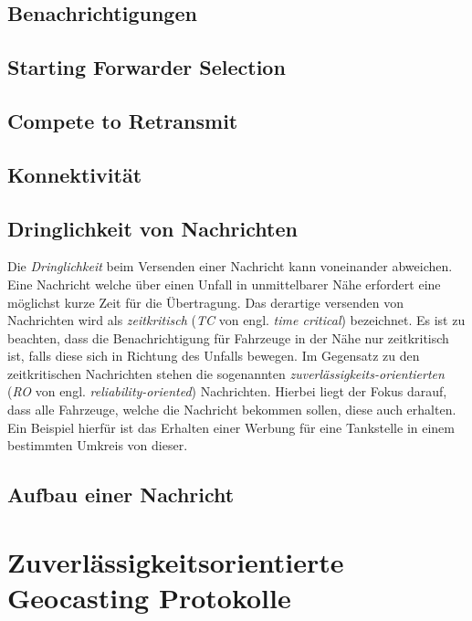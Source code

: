 \documentclass[english,runningheads,a4paper]{llncs}[2018/03/10]
\begin{document}
\subsection{Benachrichtigungen}

\subsection{Starting Forwarder Selection}

\subsection{Compete to Retransmit}

\subsection{Konnektivität}

\subsection{Dringlichkeit von Nachrichten}
Die \textit{Dringlichkeit} beim Versenden einer Nachricht kann voneinander abweichen.
Eine Nachricht welche über einen Unfall in unmittelbarer Nähe erfordert eine möglichst kurze Zeit für die Übertragung.
Das derartige versenden von Nachrichten wird als \textit{zeitkritisch} (\textit{TC} von engl. \textit{time critical}) bezeichnet.
Es ist zu beachten, dass die Benachrichtigung für Fahrzeuge in der Nähe nur zeitkritisch ist, falls diese sich in Richtung des Unfalls bewegen.
Im Gegensatz zu den zeitkritischen Nachrichten stehen die sogenannten \textit{zuverlässigkeits-orientierten} (\textit{RO} von engl. \textit{reliability-oriented}) Nachrichten.
Hierbei liegt der Fokus darauf, dass alle Fahrzeuge, welche die Nachricht bekommen sollen, diese auch erhalten.
Ein Beispiel hierfür ist das Erhalten einer Werbung für eine Tankstelle in einem bestimmten Umkreis von dieser.

\subsection{Aufbau einer Nachricht}

\section{Zuverlässigkeitsorientierte Geocasting Protokolle}
\label{sec:reliabiltyorientedgeoprotocolls}
\end{document}

